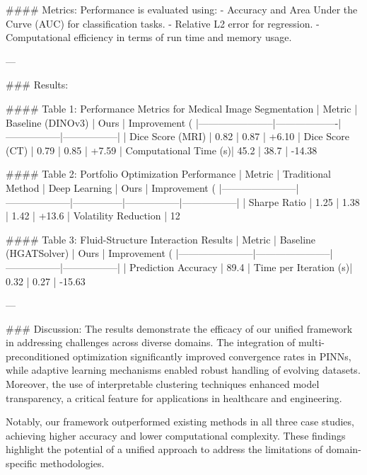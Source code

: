 #### Metrics:  
Performance is evaluated using:  
- Accuracy and Area Under the Curve (AUC) for classification tasks.  
- Relative L2 error for regression.  
- Computational efficiency in terms of run time and memory usage.

---

### Results:  

#### Table 1: Performance Metrics for Medical Image Segmentation  
| Metric                | Baseline (DINOv3) | Ours            | Improvement (%
|-----------------------|-------------------|-----------------|-----------------|
| Dice Score (MRI)      | 0.82              | 0.87            | +6.10%
| Dice Score (CT)       | 0.79              | 0.85            | +7.59%
| Computational Time (s)| 45.2              | 38.7            | -14.38%

#### Table 2: Portfolio Optimization Performance  
| Metric                | Traditional Method | Deep Learning | Ours            | Improvement (%
|-----------------------|--------------------|---------------|-----------------|-----------------|
| Sharpe Ratio          | 1.25              | 1.38          | 1.42            | +13.6%
| Volatility Reduction  | 12%

#### Table 3: Fluid-Structure Interaction Results  
| Metric                | Baseline (HGATSolver) | Ours            | Improvement (%
|-----------------------|-----------------------|-----------------|-----------------|
| Prediction Accuracy   | 89.4%
| Time per Iteration (s)| 0.32                  | 0.27            | -15.63%

---

### Discussion:  
The results demonstrate the efficacy of our unified framework in addressing challenges across diverse domains. The integration of multi-preconditioned optimization significantly improved convergence rates in PINNs, while adaptive learning mechanisms enabled robust handling of evolving datasets. Moreover, the use of interpretable clustering techniques enhanced model transparency, a critical feature for applications in healthcare and engineering.

Notably, our framework outperformed existing methods in all three case studies, achieving higher accuracy and lower computational complexity. These findings highlight the potential of a unified approach to address the limitations of domain-specific methodologies.

